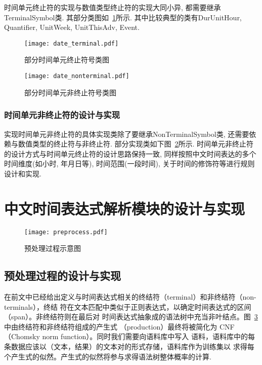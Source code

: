 时间单元终止符的实现与数值类型终止符的实现大同小异, 都需要继承TerminalSymbol类.  其部分类图如~\ref{fig:date_terminal}所示.
其中比较典型的类有DurUnitHour, Quantifier, UnitWeek, UnitThisAdv, Event.


\begin{figure}[h]
    \centering
    \texttt{[image: date\_terminal.pdf]}
    \caption{部分时间单元终止符号类图}
    \label{fig:date_terminal}
\end{figure}

\begin{figure}[h]
    \centering
    \texttt{[image: date\_nonterminal.pdf]}
    \caption{部分时间单元非终止符号类图}
    \label{fig:date_nonterminal}
\end{figure}


\subsubsection{时间单元非终止符的设计与实现}


实现时间单元非终止符的具体实现类除了要继承NonTerminalSymbol类, 还需要依赖与数值类型的终止符与非终止符. 部分实现类如下图~\ref{fig:date_nonterminal}所示.
时间单元非终止符的设计方式与时间单元终止符的设计思路保持一致, 同样按照中文时间表达的多个时间维度(如小时, 年月日等), 时间范围(一段时间), 关于时间的修饰符等进行规则设计和实现.


\section{中文时间表达式解析模块的设计与实现}

\begin{figure}[h]
    \centering
    \texttt{[image: preprocess.pdf]}
    \caption{预处理过程示意图}
    \label{fig:preprocess}
\end{figure}


\subsection{预处理过程的设计与实现}

在前文中已经给出定义与时间表达式相关的终结符（terminal）和非终结符（non-terminals），终结
符在文本匹配中类似于正则表达式，以确定时间表达式的区间（span）。非终结符则在最后对
时间表达式抽象成的语法树中充当非叶结点。图~\ref{fig:preprocess}中由终结符和非终结符组成的产生式
（production）最终将被简化为 CNF（Chomsky norm function）。同时我们需要向语料库中写入
语料，语料库中的每条数据应该以（文本，结果）的文本对的形式存储，语料库作为训练集以
求得每个产生式的似然。产生式的似然将参与求得语法树整体概率的计算.

